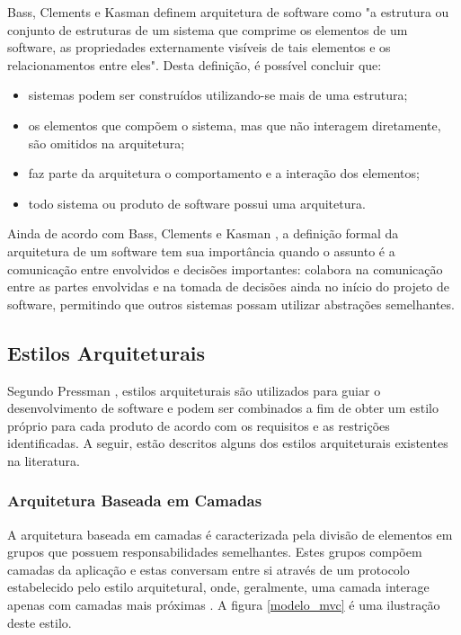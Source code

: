 Bass, Clements e Kasman \cite{bass_software_archi_practice_2003} definem arquitetura de software como "a estrutura ou conjunto de estruturas de um sistema que comprime os elementos de um software, as propriedades externamente visíveis de tais elementos e os relacionamentos entre eles". Desta definição, é possível concluir que:
\begin{itemize}
\item sistemas podem ser construídos utilizando-se mais de uma estrutura;
\item os elementos que compõem o sistema, mas que não interagem diretamente, são omitidos na arquitetura;
\item faz parte da arquitetura o comportamento e a interação dos elementos;
\item todo sistema ou produto de software possui uma arquitetura.
\end{itemize}

Ainda de acordo com Bass, Clements e Kasman \cite{bass_software_archi_practice_2003}, a definição formal da arquitetura de um software tem sua importância quando o assunto é a comunicação entre envolvidos e decisões importantes: colabora na comunicação entre as partes envolvidas e na tomada de decisões ainda no início do projeto de software, permitindo que outros sistemas possam utilizar abstrações semelhantes.

\subsection{Estilos Arquiteturais}
Segundo Pressman \cite{pressman2006engenharia}, estilos arquiteturais são utilizados para guiar o desenvolvimento de software e podem ser combinados a fim de obter um estilo próprio para cada produto de acordo com os requisitos e as restrições identificadas. A seguir, estão descritos alguns dos estilos arquiteturais existentes na literatura.

\subsubsection{Arquitetura Baseada em Camadas}
A arquitetura baseada em camadas é caracterizada pela divisão de elementos em grupos que possuem responsabilidades semelhantes. Estes grupos compõem camadas da aplicação e estas conversam entre si através de um protocolo estabelecido pelo estilo arquitetural, onde, geralmente, uma camada interage apenas com camadas mais próximas \cite{pressman2006engenharia}. A figura \ref{modelo_mvc} é uma ilustração deste estilo.

